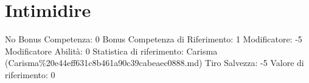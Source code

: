 \section{Intimidire}\label{intimidire}

\begin{description}
\tightlist
\item[Tags: ABI]
No Bonus Competenza: 0 Bonus Competenza di Riferimento: 1 Modificatore:
-5 Modificatore Abilità: 0 Statistica di riferimento: Carisma
(Carisma\%20e44eff631c8b461a90c39cabeaec0888.md) Tiro Salvezza: -5
Valore di riferimento: 0
\end{description}
